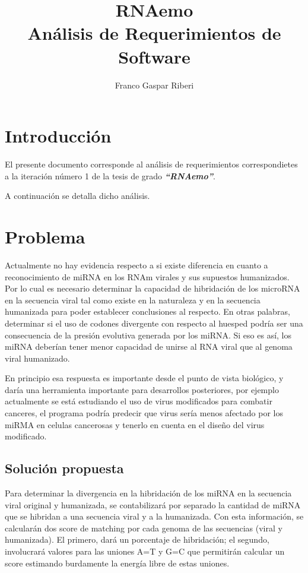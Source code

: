 \documentclass[12pt,a4paper,spanish]{article}
\title{\textbf{RNAemo}\\ \vspace{0.45cm} Análisis de Requerimientos de Software}
\author{Franco Gaspar Riberi}
\begin{document}
\maketitle\pagebreak{}\tableofcontents{}\pagebreak{}

\newpage


\section{Introducción}
	\par El presente documento corresponde al análisis de requerimientos correspondietes a
	la iteración número 1 de la tesis de grado \textit{\textbf{``RNAemo''}}.
	\par A continuación se detalla dicho análisis.

\section{Problema}
	\par Actualmente no hay evidencia respecto a si existe diferencia en cuanto a reconocimiento de miRNA en los RNAm virales y sus supuestos humanizados. 		Por lo cual es necesario determinar la capacidad de hibridación de los microRNA en la secuencia viral tal como existe en la naturaleza y en la 	
	secuencia humanizada para poder establecer conclusiones al respecto. En otras palabras, determinar si el uso de codones divergente con respecto al 		huesped podría ser una consecuencia de la presión evolutiva generada por los miRNA. Si eso es así, los miRNA deberían tener menor capacidad de unirse 		al RNA viral que al genoma viral humanizado. 

	\par En principio esa respuesta es importante desde el punto de vista biológico, y daría una herramienta importante 	para desarrollos posteriores, por ejemplo actualmente se está estudiando el uso de virus modificados para combatir 		canceres, el programa podría predecir que virus sería menos afectado por los miRMA en celulas cancerosas y tenerlo en 		cuenta en el diseño del virus modificado.

	\subsection{Solución propuesta}
		\par Para determinar la divergencia en la hibridación de los miRNA en la secuencia viral original y humanizada, se 			contabilizará por separado la cantidad de miRNA que se hibridan a una secuencia viral y a la humanizada. Con esta 			información, se calcularán dos score de matching por cada genoma de las secuencias (viral y humanizada). El 		primero, dará un porcentaje de hibridación; el segundo, involucrará valores para las uniones \textsc{A=T} y
		\textsc{G=C} que permitirán calcular un score estimando burdamente la energía libre de estas uniones.
\end{document}

